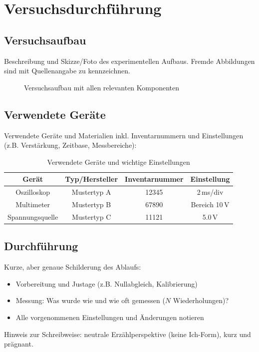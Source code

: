 \section{Versuchsdurchführung}
\label{cap:Versuchsdurchfuehrung}

\subsection{Versuchsaufbau}
\label{cap:Versuchsaufbau}
Beschreibung und Skizze/Foto des experimentellen Aufbaus. Fremde Abbildungen sind mit Quellenangabe zu kennzeichnen.

\begin{figure}[H]
    \centering
    \caption{Versuchsaufbau mit allen relevanten Komponenten}
    \label{fig:Aufbau}
\end{figure}

\subsection{Verwendete Geräte}
\label{cap:Geraete}
Verwendete Geräte und Materialien inkl. Inventarnummern und Einstellungen (z.B. Verstärkung, Zeitbase, Messbereiche):
\begin{table}[H]
    \centering
    \caption{Verwendete Geräte und wichtige Einstellungen}
    \begin{tabular}{c|c|c|c}
        \label{tab:Geraete}
        Gerät & Typ/Hersteller & Inventarnummer & Einstellung \\
        \hline
        Oszilloskop & Mustertyp A & 12345 & 2\,ms/div \\
        Multimeter & Mustertyp B & 67890 & Bereich 10\,V \\
        Spannungsquelle & Mustertyp C & 11121 & 5.0\,V \\
    \end{tabular}
\end{table}

\subsection{Durchführung}
\label{cap:Durchfuehrung}
Kurze, aber genaue Schilderung des Ablaufs:
\begin{itemize}
    \item Vorbereitung und Justage (z.B. Nullabgleich, Kalibrierung)
    \item Messung: Was wurde wie und wie oft gemessen ($N$ Wiederholungen)?
    \item Alle vorgenommenen Einstellungen und Änderungen notieren
\end{itemize}
Hinweis zur Schreibweise: neutrale Erzählperspektive (keine Ich-Form), kurz und prägnant.
